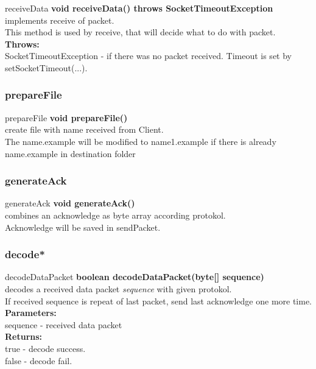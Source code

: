 \documentclass[12pt]{article}
\begin{document}
\begin{mybox}[colback=white]{receiveData}
\textbf{void receiveData() throws SocketTimeoutException} \\
implements receive of packet. \\
This method is used by receive, that will decide what to do with packet.
\\
\textbf{Throws:} \\
SocketTimeoutException - if there was no packet received. Timeout is
set by setSocketTimeout(...). \\
\end{mybox}

\subsubsection{prepareFile}
\begin{mybox}[colback=white]{prepareFile}
\textbf{void prepareFile()} \\
create file with name received from Client. \\
The name.example will be modified to name1.example
if there is already name.example in destination folder
\end{mybox}

\subsubsection{generateAck}
\begin{mybox}[colback=white]{generateAck}
\textbf{void generateAck()} \\
combines an acknowledge as byte array according protokol. \\
Acknowledge will be saved in sendPacket.
\end{mybox}

\subsubsection{decode*}
\begin{mybox}[colback=white]{decodeDataPacket}
\textbf{boolean decodeDataPacket(byte[] sequence)} \\
decodes a received data packet \textit{sequence} with given protokol. \\
If received sequence is repeat of last packet, send last acknowledge
one more time.
\\
\textbf{Parameters:} \\
sequence - received data packet \\
\textbf{Returns:} \\
true - decode success. \\
false - decode fail.
\end{mybox}
\end{document}
